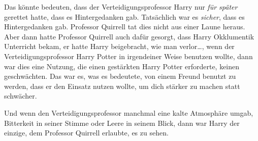 Das könnte bedeuten, dass der Verteidigungsprofessor Harry nur \emph{für später} gerettet hatte, dass es Hintergedanken gab. Tatsächlich war es \emph{sicher}, dass es Hintergedanken gab. Professor Quirrell tat dies nicht aus einer Laune heraus. Aber dann hatte Professor Quirrell auch dafür gesorgt, dass Harry Okklumentik Unterricht bekam, er hatte Harry beigebracht, wie man verlor…, wenn der Verteidigungsprofessor Harry Potter in irgendeiner Weise benutzen wollte, dann war dies eine Nutzung, die einen gestärkten Harry Potter erforderte, keinen geschwächten. Das war es, was es bedeutete, von einem Freund benutzt zu werden, dass er den Einsatz nutzen wollte, um dich stärker zu machen statt schwächer.

Und wenn den Verteidigungsprofessor manchmal eine kalte Atmosphäre umgab, Bitterkeit in seiner Stimme oder Leere in seinem Blick, dann war Harry der einzige, dem Professor Quirrell erlaubte, es zu sehen.

